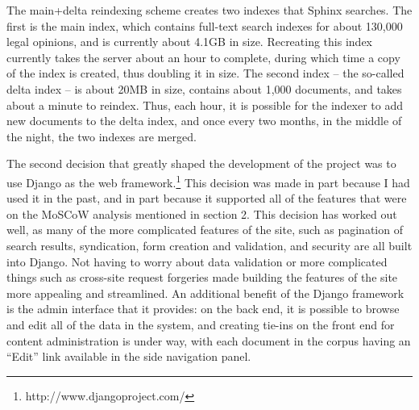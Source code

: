 The main+delta reindexing scheme creates two indexes that Sphinx searches. The first is the main index, which contains full-text search indexes for about 130,000 legal opinions, and is currently about 4.1GB in size. Recreating this index currently takes the server about an hour to complete, during which time a copy of the index is created, thus doubling it in size. The second index -- the so-called delta index -- is about 20MB in size, contains about 1,000 documents, and takes about a minute to reindex. Thus, each hour, it is possible for the indexer to add new documents to the delta index, and once every two months, in the middle of the night, the two indexes are merged.


The second decision that greatly shaped the development of the project was to use Django as the web framework.\footnote{http://www.djangoproject.com/} This decision was made in part because I had used it in the past, and in part because it supported all of the features that were on the MoSCoW analysis mentioned in section 2. This decision has worked out well, as many of the more complicated features of the site, such as pagination of search results, syndication, form creation and validation, and security are all built into Django. Not having to worry about data validation or more complicated things such as cross-site request forgeries made building the features of the site more appealing and streamlined. An additional benefit of the Django framework is the admin interface that it provides: on the back end, it is possible to browse and edit all of the data in the system, and creating tie-ins on the front end for content administration is under way, with each document in the corpus having an ``Edit'' link available in the side navigation panel.


